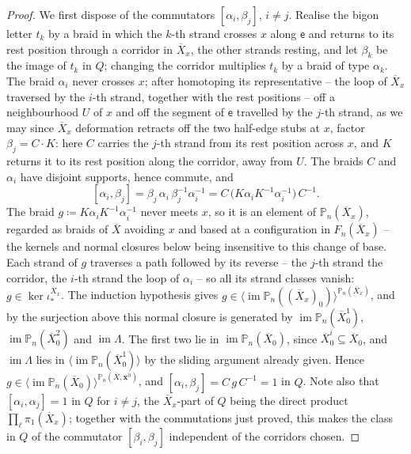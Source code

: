 \documentclass[reqno]{amsart}
\theoremstyle{definition}
\newcommand\bfx{\mathbf{x}}
\newcommand\sfe{\mathsf{e}}
\newcommand{\PB}{\mathbb{P}}
\newcommand{\im}{\operatorname{im}}
\newcommand{\co}[1]{\mathopen{\langle}#1\mathclose{\rangle}} %
\newcommand{\base}{\bfx^0}
\renewcommand{\bar}{\overline}
\numberwithin{equation}{section}
\begin{document}
\begin{proof}
We first dispose of the commutators \([\alpha_i,\beta_j]\),
\(i\neq j\). Realise the bigon letter \(t_k\) by a braid in
which the \(k\)-th strand crosses \(x\) along \(\sfe\) and returns
to its rest position through a corridor in \(\bar X_x\), the
other strands resting, and let \(\beta_k\) be the image of
\(t_k\) in \(Q\); changing the corridor multiplies \(t_k\) by a
braid of type \(\alpha_k\). The braid \(\alpha_i\) never crosses
\(x\); after
homotoping its representative -- the loop of \(\bar X_x\)
traversed by the \(i\)-th strand, together with the rest
positions -- off a neighbourhood \(U\) of \(x\) and off the
segment of \(\sfe\) travelled by the \(j\)-th strand, as we may
since \(\bar X_x\) deformation retracts off the two half-edge
stubs at \(x\), factor \(\beta_j=C\cdot K\): here \(C\) carries
the \(j\)-th strand from its rest position across \(x\), and
\(K\) returns it to its rest position along the corridor, away
from \(U\). The braids \(C\) and \(\alpha_i\) have disjoint
supports, hence commute, and
\[
[\alpha_i,\beta_j]
=\beta_j\,\alpha_i\,\beta_j^{-1}\alpha_i^{-1}
=C\,\bigl(K\alpha_iK^{-1}\alpha_i^{-1}\bigr)\,C^{-1} .
\]
The braid \(g\coloneqq K\alpha_iK^{-1}\alpha_i^{-1}\) never
meets \(x\), so it is an element of \(\PB_n(\bar X_x)\),
regarded as braids of \(\bar X\) avoiding \(x\) and based at a
configuration in \(F_n(\bar X_x)\) -- the kernels and normal
closures below being insensitive to this change of base. Each
strand of \(g\) traverses a path followed by its reverse -- the
\(j\)-th strand the corridor, the \(i\)-th strand the loop of
\(\alpha_i\) -- so all its strand classes vanish:
\(g\in\ker\iota^{\bar X_x}_\ast\). The induction hypothesis
gives
\(g\in\co{\im\PB_n((\bar X_x)_0)}^{\PB_n(\bar X_x)}\), and by
the surjection above this normal closure is generated by
\(\im\PB_n(\bar X^1_0)\), \(\im\PB_n(\bar X^2_0)\) and
\(\im\Lambda\). The first two lie in \(\im\PB_n(\bar X_0)\),
since \(\bar X^i_0\subseteq\bar X_0\), and \(\im\Lambda\) lies
in \(\co{\im\PB_n(\bar X^1_0)}\) by the sliding argument already
given. Hence
\(g\in\co{\im\PB_n(\bar X_0)}^{\PB_n(\bar X,\base)}\), and
\([\alpha_i,\beta_j]=C\,g\,C^{-1}=1\) in \(Q\). Note also that
\([\alpha_i,\alpha_j]=1\) in \(Q\) for \(i\neq j\), the
\(\bar X_x\)-part of \(Q\) being the direct product
\(\prod_\ell\pi_1(\bar X_x)\); together with the commutations
just proved, this makes the class in \(Q\) of the commutator
\([\beta_i,\beta_j]\) independent of the corridors chosen.


\end{proof}
\end{document}

